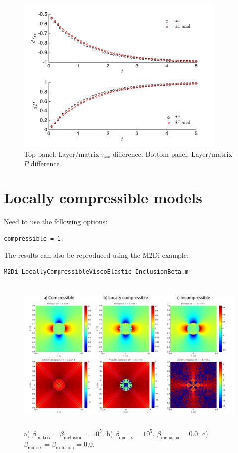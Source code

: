\documentclass[12pt,english,openany]{scrbook}
\begin{document}
\begin{figure}[ht!]
\centerline{\includegraphics[height=3.0in]{./Figures/VangelisTest_MDOODZ}}
\caption{Top panel: Layer/matrix $\tau_{xx}$ difference. Bottom panel: Layer/matrix $P$ difference.}
\label{Vangelis}
\end{figure}

\section{Locally compressible models}

Need to use the following options:
\begin{verbatim} 
compressible = 1
\end{verbatim} %

The results can also be reproduced using the M2Di example:
\begin{verbatim} 
M2Di_LocallyCompressibleViscoElastic_InclusionBeta.m
\end{verbatim}

\begin{figure}[ht!]
\centerline{\includegraphics[height=3.0in]{./Figures/LocallyCompressible_MDOODZ}}
\caption{a) $\beta_{\text{matrix}} = \beta_{\text{inclusion}} = 10^{5} $. b) $\beta_{\text{matrix}} = 10^{5} $, $\beta_{\text{inclusion}} = 0.0$. c) $\beta_{\text{matrix}} = \beta_{\text{inclusion}} = 0.0 $.}
\label{LocComp}
\end{figure}
\end{document}
